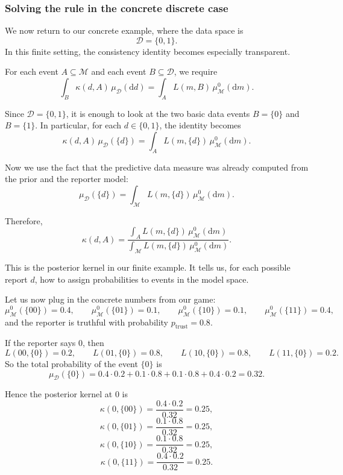 \documentclass[11pt]{article}
\theoremstyle{remark}
\newcommand{\modelspace}{\mathcal{M}}
\newcommand{\dataspace}{\mathcal{D}}
\begin{document}
\vspace{2mm}



\subsubsection{Solving the rule in the concrete discrete case}

We now return to our concrete example, where the data space is
\[
\dataspace=\{0,1\}.
\]
In this finite setting, the consistency identity becomes especially transparent.

For each event \(A \subseteq \modelspace\) and each event \(B \subseteq \dataspace\), we require
\[
\int_B \kappa(d,A)\,\mu_{\dataspace}(\mathrm dd)
=
\int_A L(m,B)\,\mu_{\modelspace}^0(\mathrm dm).
\]

Since \(\dataspace=\{0,1\}\), it is enough to look at the two basic data events \(B=\{0\}\) and \(B=\{1\}\). In particular, for each \(d \in \{0,1\}\), the identity becomes
\[
\kappa(d,A)\,\mu_{\dataspace}(\{d\})
=
\int_A L(m,\{d\})\,\mu_{\modelspace}^0(\mathrm dm).
\]

Now we use the fact that the predictive data measure was already computed from the prior and the reporter model:
\[
\mu_{\dataspace}(\{d\})
=
\int_{\modelspace} L(m,\{d\})\,\mu_{\modelspace}^0(\mathrm dm).
\]

Therefore,
\[
\kappa(d,A)
=
\frac{\displaystyle \int_A L(m,\{d\})\,\mu_{\modelspace}^0(\mathrm dm)}
{\displaystyle \int_{\modelspace} L(m,\{d\})\,\mu_{\modelspace}^0(\mathrm dm)}.
\]

This is the posterior kernel in our finite example. It tells us, for each possible report \(d\), how to assign probabilities to events in the model space.

\vspace{2mm}

Let us now plug in the concrete numbers from our game:
\[
\mu_{\modelspace}^0(\{00\})=0.4,\qquad
\mu_{\modelspace}^0(\{01\})=0.1,\qquad
\mu_{\modelspace}^0(\{10\})=0.1,\qquad
\mu_{\modelspace}^0(\{11\})=0.4,
\]
and the reporter is truthful with probability \(p_{\mathrm{trust}}=0.8\).

If the reporter says \(0\), then
\[
L(00,\{0\})=0.2,\qquad
L(01,\{0\})=0.8,\qquad
L(10,\{0\})=0.8,\qquad
L(11,\{0\})=0.2.
\]
So the total probability of the event \(\{0\}\) is
\[
\mu_{\dataspace}(\{0\})
=
0.4\cdot 0.2
+
0.1\cdot 0.8
+
0.1\cdot 0.8
+
0.4\cdot 0.2
=
0.32.
\]

Hence the posterior kernel at \(0\) is
\[
\kappa(0,\{00\})
=
\frac{0.4\cdot 0.2}{0.32}
=
0.25,
\]
\[
\kappa(0,\{01\})
=
\frac{0.1\cdot 0.8}{0.32}
=
0.25,
\]
\[
\kappa(0,\{10\})
=
\frac{0.1\cdot 0.8}{0.32}
=
0.25,
\]
\[
\kappa(0,\{11\})
=
\frac{0.4\cdot 0.2}{0.32}
=
0.25.
\]
\end{document}
